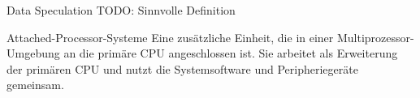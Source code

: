 \begin{defi}{Data Speculation}
    TODO: Sinnvolle Definition
\end{defi}

\begin{defi}{Attached-Processor-Systeme}
    Eine zusätzliche Einheit,
    die in einer Multiprozessor-Umgebung an die primäre CPU angeschlossen ist.
    Sie arbeitet als Erweiterung der primären CPU und
    nutzt die Systemsoftware und Peripheriegeräte gemeinsam.
\end{defi}